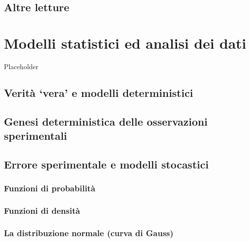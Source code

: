 \documentclass[a4paper,12pt,oneside]{book}
\begin{document}
\hypertarget{altre-letture-2}{%
\section{Altre letture}\label{altre-letture-2}}

\hypertarget{modelli-statistici-ed-analisi-dei-dati}{%
\chapter{Modelli statistici ed analisi dei dati}\label{modelli-statistici-ed-analisi-dei-dati}}

Placeholder

\hypertarget{verituxe0-vera-e-modelli-deterministici}{%
\section{Verità `vera' e modelli deterministici}\label{verituxe0-vera-e-modelli-deterministici}}

\hypertarget{genesi-deterministica-delle-osservazioni-sperimentali}{%
\section{Genesi deterministica delle osservazioni sperimentali}\label{genesi-deterministica-delle-osservazioni-sperimentali}}

\hypertarget{errore-sperimentale-e-modelli-stocastici}{%
\section{Errore sperimentale e modelli stocastici}\label{errore-sperimentale-e-modelli-stocastici}}

\hypertarget{funzioni-di-probabilituxe0}{%
\subsection{Funzioni di probabilità}\label{funzioni-di-probabilituxe0}}

\hypertarget{funzioni-di-densituxe0}{%
\subsection{Funzioni di densità}\label{funzioni-di-densituxe0}}

\hypertarget{la-distribuzione-normale-curva-di-gauss}{%
\subsection{La distribuzione normale (curva di Gauss)}\label{la-distribuzione-normale-curva-di-gauss}}
\end{document}
